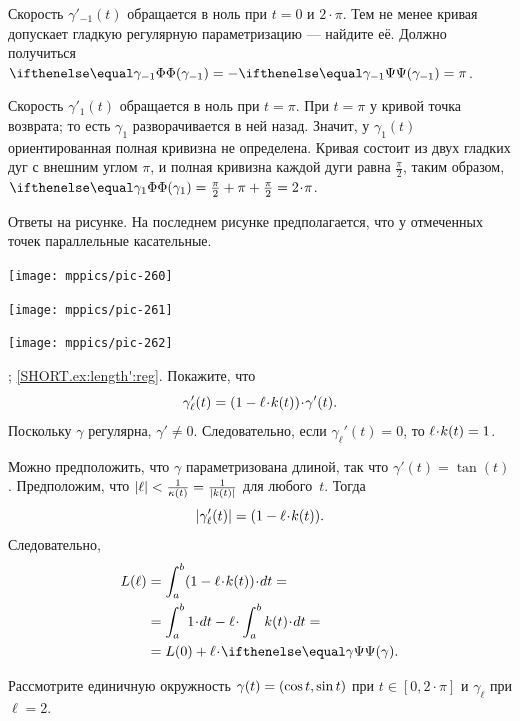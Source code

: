 \begin{multicols}{2}
Скорость $\gamma'_{-1}(t)$ обращается в ноль при $t=0$ и $2\cdot\pi$.
Тем не менее кривая допускает гладкую регулярную параметризацию --- найдите её.
Должно получиться $\tc{\gamma_{-1}}\z=-\tgc{\gamma_{-1}}=\pi$.

Скорость $\gamma'_1(t)$ обращается в ноль при $t=\pi$.
При $t=\pi$ у кривой точка возврата;
то есть $\gamma_1$ разворачивается в ней назад.
Значит, у $\gamma_1(t)$ ориентированная полная кривизна не определена.
Кривая состоит из двух гладких дуг с внешним углом $\pi$, и
полная кривизна каждой дуги равна $\tfrac\pi2$, таким образом, 
$\tc{\gamma_{1}}=\tfrac\pi2+\pi+\tfrac\pi2=2\cdot\pi$.

Ответы на рисунке.
На последнем рисунке предполагается, что у отмеченных точек параллельные касательные. 

\begin{Figure}
\begin{minipage}{.27\textwidth}
\centering
\texttt{[image: mppics/pic-260]}
\end{minipage}\hfill
\begin{minipage}{.42\textwidth}
\centering
\texttt{[image: mppics/pic-261]}
\end{minipage}
\hfill
\begin{minipage}{.27\textwidth}
\centering
\texttt{[image: mppics/pic-262]}
\end{minipage}
\end{Figure}

\parbf{\ref{ex:length'}}; \ref{SHORT.ex:length':reg}.
Покажите, что
\[
\gamma_\ell'(t)=(1-\ell\cdot\skur(t))\cdot \gamma'(t).
\]
Поскольку $\gamma$ регулярна, $\gamma'\ne0$.
Следовательно, если $\gamma_\ell'(t)=0$, то $\ell\cdot \skur(t)= 1$.

Можно предположить, что $\gamma$ параметризована длиной, так что $\gamma'(t)=\tan(t)$.
Предположим, что $|\ell|<\frac{1}{\kappa(t)}=\frac{1}{|k(t)|}$ для любого~$t$.
Тогда 
\[
|\gamma_\ell'(t)|=(1-\ell\cdot\skur(t)).
\]
Следовательно,
\begin{align*}
L(\ell)
&=
\int_a^b(1-\ell\cdot\skur(t))\cdot dt=
\\&=
\int_a^b 1\cdot dt-\ell\cdot \int_a^b\skur(t)\cdot dt=
\\
&=
L(0)+\ell\cdot\tgc\gamma.
\end{align*}

Рассмотрите единичную окружность $\gamma(t)\z=(\cos t,\sin t)$ при $t\in[0,2\cdot\pi]$ и $\gamma_\ell$ при $\ell=2$.


\end{multicols}
